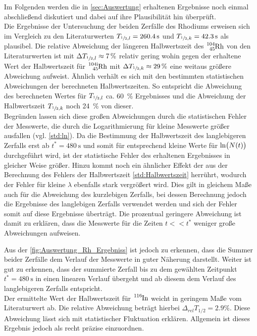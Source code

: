 Im Folgenden werden die in \cref{sec:Auswertung} erhaltenen Ergebnisse noch einmal 
abschließend diskutiert und dabei auf ihre Plausibilität hin überprüft.\\


Die Ergebnisse der Untersuchung der beiden Zerfälle des Rhodiums erweisen sich im Vergleich 
zu den Literaturwerten \cite{NuklidKarte_Rh} $T_{\sfrac{1}{2},l} = \SI{260.4}{\second}$ und
$T_{\sfrac{1}{2},k} = \SI{42.3}{\second}$ als plausibel. Die relative Abweichung der
längeren Halbwertszeit des $\ce{^{104}_{45}Rh}$ von den Literaturwerten ist mit $\Delta T_{\sfrac{1}{2},l} \approx 
\SI{7}{\percent}$ relativ gering wohin gegen der erhaltene Wert der Halbwertszeit für  $\ce{^{104i}_{45}Rh}$
mit $\Delta T_{\sfrac{1}{2},k} \approx \SI{29}{\percent}$ eine weitaus größere Abweichung aufweist.
Ähnlich verhält es sich mit den bestimmten statistischen Abweichungen der berechneten 
Halbwertszeiten. So entspricht die Abweichung des berechneten Wertes für $T_{\sfrac{1}{2},l}$ 
ca. \SI{60}{\percent} Ergebnisses und die Abweichung der Halbwertszeit $T_{\sfrac{1}{2},k}$ 
noch \SI{24}{\percent} von dieser.\\
Begründen lassen sich diese großen Abweichungen durch die statistischen Fehler der Messwerte,
die durch die Logarithmierung für kleine Messwerte größer ausfallen (vgl. \cref{std:ln}).
Da die Bestimmung der Halbwertszeit des langlebigeren Zerfalls erst ab $t^{*} = \SI{480}{\second}$
und somit für entsprechend kleine Werte für $\Ln{N(t)}$ durchgeführt wird, ist der statistische 
Fehler des erhaltenen Ergebnisses in gleicher Weise größer. Hinzu kommt noch ein ähnlicher Effekt  
der aus der Berechnung des Fehlers der Halbwertszeit \cref{std:Halbwertszeit} herrührt, wodurch der 
Fehler für kleine $\lambda$ ebenfalls stark vergrößert wird.
Dies gilt in gleichem Maße auch für die Abweichung des kurzlebigen Zerfalls, bei dessen Berechnung
jedoch die Ergebnisse des langlebigen Zerfalls verwendet werden und sich der Fehler somit auf diese
Ergebnisse überträgt. Die prozentual geringere Abweichung ist damit zu erklären, dass die Messwerte
für die Zeiten $t << t^{*}$ weniger große Abweichungen aufweisen.

Aus der \cref{fig:Auswertung_Rh_Ergebniss} ist jedoch zu erkennen, dass die Summer beider Zerfälle dem 
Verlauf der Messwerte in guter Näherung darstellt. Weiter ist gut zu erkennen, dass der summierte 
Zerfall bis zu dem gewählten Zeitpunkt $t^{*} = \SI{480}{\second}$ in einen linearen Verlauf 
übergeht und ab diesem dem Verlauf des langlebigeren Zerfalls entspricht.\\

Der ermittelte Wert der Halbwertszeit für $\ce{^{116}In}$ weicht in geringem Maße vom Literaturwert \cite{NuklidKarte_In} ab. Die relative Abweichung beträgt hierbei $\Delta_{rel}T_{1/2}=2.9\%$. Diese Abweichung lässt sich mit statistischer Fluktuation erklären. Allgemein ist dieses Ergebnis jedoch als recht präzise einzuordnen.  